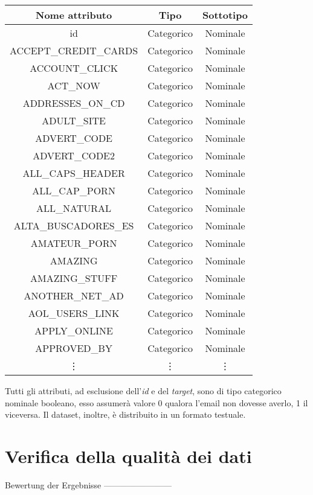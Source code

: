 \begin{tabular}{ c | c | c}
	\textbf{Nome attributo} & \textbf{Tipo} & \textbf{Sottotipo} \\
	\hline
	id & Categorico & Nominale \\ 
	ACCEPT\_CREDIT\_CARDS & Categorico & Nominale \\ 
	ACCOUNT\_CLICK & Categorico & Nominale \\ 
	ACT\_NOW & Categorico & Nominale \\ 
	ADDRESSES\_ON\_CD & Categorico & Nominale \\ 
	ADULT\_SITE & Categorico & Nominale \\ 
	ADVERT\_CODE & Categorico & Nominale \\ 
	ADVERT\_CODE2 & Categorico & Nominale \\ 
	ALL\_CAPS\_HEADER & Categorico & Nominale \\ 
	ALL\_CAP\_PORN & Categorico & Nominale \\ 
	ALL\_NATURAL & Categorico & Nominale \\ 
	ALTA\_BUSCADORES\_ES & Categorico & Nominale \\ 
	AMATEUR\_PORN & Categorico & Nominale \\ 
	AMAZING & Categorico & Nominale \\ 
	AMAZING\_STUFF & Categorico & Nominale \\ 
	ANOTHER\_NET\_AD & Categorico & Nominale \\ 
	AOL\_USERS\_LINK & Categorico & Nominale \\ 
	APPLY\_ONLINE & Categorico & Nominale \\ 
	APPROVED\_BY & Categorico & Nominale \\ 
	\vdots  &  \vdots  &  \vdots  \\
	\end{tabular}



Tutti gli attributi, ad esclusione dell'\textit{id} e del \textit{target}, sono di tipo categorico nominale booleano, esso assumerà valore 0 qualora l'email non dovesse averlo, 1 il viceversa.
Il dataset, inoltre, è distribuito in un formato testuale.


\section{Verifica della qualità dei dati}

Bewertung der Ergebnisse
------------------------

